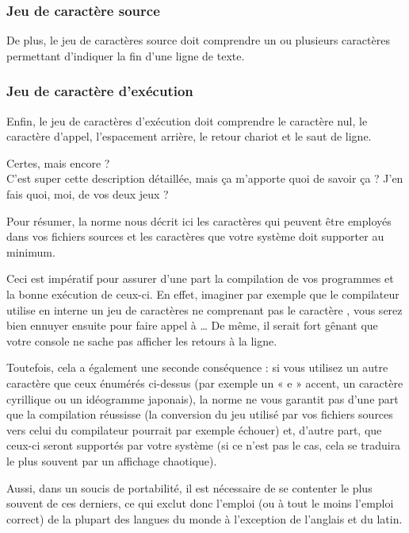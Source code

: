 \subsubsection{Jeu de caractère source}
\label{jeu-de-caractere-source}

De plus, le jeu de caractères source doit comprendre un ou plusieurs
caractères permettant d'indiquer la fin d'une ligne de texte.

\subsubsection{Jeu de caractère d'exécution}
\label{jeu-de-caractere-dexecution}

Enfin, le jeu de caractères d'exécution doit comprendre le caractère
nul, le caractère d'appel, l'espacement arrière, le retour chariot et le
saut de ligne.

\begin{questionbox}
   Certes, mais encore ?\\
C'est super cette description détaillée, mais ça m'apporte
quoi de savoir ça ? J'en fais quoi, moi, de vos deux jeux ?
\end{questionbox}


Pour résumer, la norme nous décrit ici les caractères qui peuvent être
employés dans vos fichiers sources et les caractères que votre système
doit supporter au minimum.

Ceci est impératif pour assurer d'une part la compilation de vos
programmes et la bonne exécution de ceux-ci. En effet, imaginer par
exemple que le compilateur utilise en interne un jeu de caractères ne
comprenant pas le caractère , vous serez bien ennuyer ensuite
pour faire appel à \ldots{} De même, il serait fort
gênant que votre console ne sache pas afficher les retours à la ligne.

Toutefois, cela a également une seconde conséquence : si vous utilisez
un autre caractère que ceux énumérés ci-dessus (par exemple un « e »
accent, un caractère cyrillique ou un idéogramme japonais), la norme ne
vous garantit pas d'une part que la compilation réussisse (la conversion
du jeu utilisé par vos fichiers sources vers celui du compilateur
pourrait par exemple échouer) et, d'autre part, que ceux-ci seront
supportés par votre système (si ce n'est pas le cas, cela se traduira le
plus souvent par un affichage chaotique).

Aussi, dans un soucis de portabilité, il est nécessaire de se contenter
le plus souvent de ces derniers, ce qui exclut donc l'emploi (ou à tout
le moins l'emploi correct) de la plupart des langues du monde à
l'exception de l'anglais et du latin.

